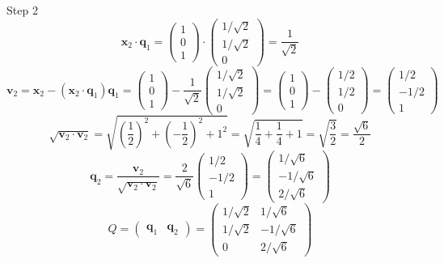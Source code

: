 \documentclass[DIV=20,oneside]{scrartcl}
\begin{document}
Step 2$$\mathbf{x}_2 \cdot \mathbf{q}_1 = \begin{pmatrix} 1 \\ 0 \\ 1 \end{pmatrix} \cdot \begin{pmatrix} 1/\sqrt{2} \\ 1/\sqrt{2} \\ 0 \end{pmatrix} = \frac{1}{\sqrt{2}}$$
$$\mathbf{v}_2 = \mathbf{x}_2 - (\mathbf{x}_2 \cdot \mathbf{q}_1)\mathbf{q}_1 = \begin{pmatrix} 1 \\ 0 \\ 1 \end{pmatrix} - \frac{1}{\sqrt{2}} \begin{pmatrix} 1/\sqrt{2} \\ 1/\sqrt{2} \\ 0 \end{pmatrix} = \begin{pmatrix} 1 \\ 0 \\ 1 \end{pmatrix} - \begin{pmatrix} 1/2 \\ 1/2 \\ 0 \end{pmatrix} = \begin{pmatrix} 1/2 \\ -1/2 \\ 1 \end{pmatrix}$$$$\sqrt{\mathbf{v}_2 \cdot \mathbf{v}_2} = \sqrt{\left(\frac{1}{2}\right)^2 + \left(-\frac{1}{2}\right)^2 + 1^2} = \sqrt{\frac{1}{4} + \frac{1}{4} + 1} = \sqrt{\frac{3}{2}} = \frac{\sqrt{6}}{2}$$
$$\mathbf{q}_2 = \frac{\mathbf{v}_2}{\sqrt{\mathbf{v}_2 \cdot \mathbf{v}_2}} = \frac{2}{\sqrt{6}} \begin{pmatrix} 1/2 \\ -1/2 \\ 1 \end{pmatrix} = \begin{pmatrix} 1/\sqrt{6} \\ -1/\sqrt{6} \\ 2/\sqrt{6} \end{pmatrix}$$
$$Q = \begin{pmatrix} \mathbf{q}_1 & \mathbf{q}_2 \end{pmatrix} = \begin{pmatrix} 1/\sqrt{2} & 1/\sqrt{6} \\ 1/\sqrt{2} & -1/\sqrt{6} \\ 0 & 2/\sqrt{6} \end{pmatrix}$$
\end{document}
